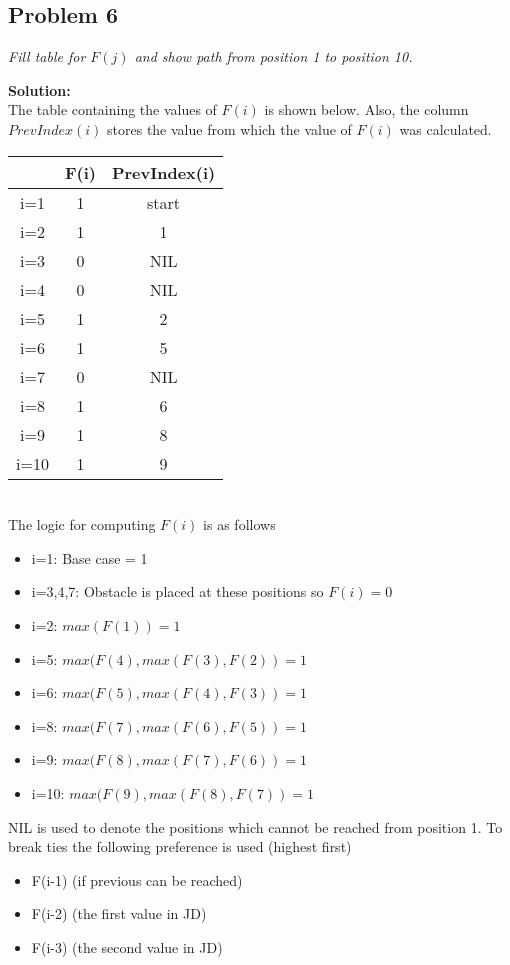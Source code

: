 \documentclass[12pt,a4paper]{article}
\newcommand{\solution}{\noindent\textbf{Solution:}\\\indent}
\begin{document}
\newpage
\subsection*{Problem 6}
\textit{
    Fill table for $F(j)$ and show path from position 1 to position 10.
}

\solution
The table containing the values of $F(i)$ is shown below. Also, the column $PrevIndex(i)$ stores the value from which the value of $F(i)$ was calculated.

\begin{tabular}{|c|c|c|}
\hline
& F(i) & PrevIndex(i) \\
\hline
i=1 & 1 & start \\
\hline
i=2 & 1 & 1 \\
\hline
i=3 & 0 & NIL \\
\hline
i=4 & 0 & NIL \\
\hline
i=5 & 1 & 2 \\
\hline
i=6 & 1 & 5 \\
\hline
i=7 & 0 & NIL \\
\hline
i=8 & 1 & 6 \\
\hline
i=9 & 1 & 8 \\
\hline
i=10 & 1 & 9 \\
\hline
\end{tabular} \\

The logic for computing $F(i)$ is as follows
\begin{itemize}
    \item i=1: Base case = 1
    \item i=3,4,7: Obstacle is placed at these positions so $F(i) = 0$
    \item i=2: $max(F(1)) = 1$
    \item i=5: $max(F(4), max(F(3), F(2)) = 1$
    \item i=6: $max(F(5), max(F(4), F(3)) = 1$
    \item i=8: $max(F(7), max(F(6), F(5)) = 1$
    \item i=9: $max(F(8), max(F(7), F(6)) = 1$
    \item i=10: $max(F(9), max(F(8), F(7)) = 1$
\end{itemize}

NIL is used to denote the positions which cannot be reached from position 1. To break ties the following preference is used (highest first)
\begin{itemize}
    \item F(i-1) (if previous can be reached)
    \item F(i-2) (the first value in JD)
    \item F(i-3) (the second value in JD)
\end{itemize}
\end{document}
